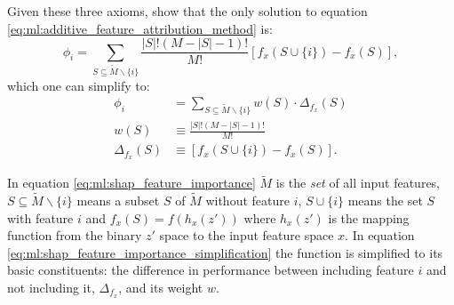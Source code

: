 \documentclass[a4paper, twoside, nobib]{tufte-book}
\begin{document}
Given these three axioms, \citet{Lundberg:2017} show that the only solution to equation \eqref{eq:ml:additive_feature_attribution_method} is:
\begin{equation}
  \label{eq:ml:shap_feature_importance}
    \phi_i = \sum_{S \subseteq \widetilde{M} \backslash \{i\}} \frac{|S|!(M-|S|-1)!}{M!} \left[ f_x(S \cup \{i\}) - f_x(S) \right] ,
\end{equation}
which one can simplify to:
\begin{equation}
  \label{eq:ml:shap_feature_importance_simplification}
  \begin{split}
    \phi_i        &= \sum_{S \subseteq \widetilde{M} \backslash \{i\}} w(S) \cdot \Delta_{f_x}(S) \\
    w(S)             &\equiv \frac{|S|!(M-|S|-1)!}{M!} \\
    \Delta_{f_x}(S)  &\equiv \left[ f_x(S \cup \{i\}) - f_x(S) \right].
  \end{split}
\end{equation}


In equation \eqref{eq:ml:shap_feature_importance} $\widetilde{M}$ is the \emph{set} of all input features, $S \subseteq \widetilde{M} \backslash \{i\}$ means a subset $S$ of $\widetilde{M}$ without feature $i$, $S \cup \{i\}$ means the set $S$ with feature $i$ and $f_x(S) = f(h_x(z'))$ where $h_x(z')$ is the mapping function from the binary $z'$ space to the input feature space $x$. In equation \eqref{eq:ml:shap_feature_importance_simplification} the function is simplified to its basic constituents: the difference in performance  between including feature $i$ and not including it, $\Delta_{f_x}$, and its weight $w$. 
\end{document}
